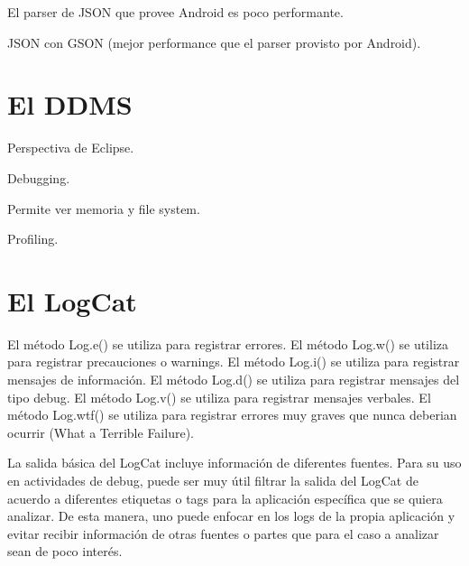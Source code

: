 El parser de JSON que provee Android es poco performante.

JSON con GSON (mejor performance que el parser provisto  por Android).

\section{El \ac{DDMS}}
\label{sec:ddms}

Perspectiva de Eclipse.

Debugging.

Permite ver memoria y file system.

Profiling.

\section{El LogCat}
\label{sec:logcat}

El m\'etodo Log.e() se utiliza para registrar errores.
El m\'etodo Log.w() se utiliza para registrar precauciones o warnings.
El m\'etodo Log.i() se utiliza para registrar mensajes de informaci\'on.
El m\'etodo Log.d() se utiliza para registrar mensajes del tipo debug.
El m\'etodo Log.v() se utiliza para registrar mensajes verbales.
El m\'etodo Log.wtf() se utiliza para registrar errores muy graves que nunca deberian ocurrir (What a Terrible Failure).

La salida b\'asica del LogCat incluye informaci\'on de diferentes fuentes. Para su uso en actividades de debug, puede ser muy \'util filtrar la salida del LogCat de acuerdo a diferentes etiquetas o tags para la aplicaci\'on espec\'ifica que se quiera analizar. De esta manera, uno puede enfocar en los logs de la propia aplicaci\'on y evitar recibir informaci\'on de otras fuentes o partes que para el caso a analizar sean de poco inter\'es.
